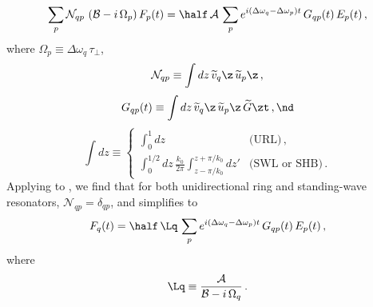 \begin{equation} \label{eqn:mml_fq_sol_temp}
  \sum_p \mathcal{N}_{q p}\, \left(\mathcal{B} - i\, \Omega_p\right) F_p(t) = \half\, \mathcal{A}\, \sum_p e^{i \left(\Delta \omega_q - \Delta \omega_p\right) t}\, G_{q p}(t)\, E_p(t)\, , 
\end{equation}
where $\Omega_p \equiv \Delta \omega_q\, \tau_\perp$,
\begin{equation} \label{eqn:mml_nqp_def}
  \mathcal{N}_{q p} \equiv \int d z\, \widetilde{v}_q\z\, \widetilde{u}_p\z\, ,
\end{equation}
\begin{equation} \label{eqn:mml_gqp_def}  
  G_{q p}(t) \equiv \int d z\, \widetilde{v}_q\z\, \widetilde{u}_p\z\, \widetilde{G}\zt\, , \nd
\end{equation}
\begin{equation} \label{eqn:mml_zop_def}
  \int d z \equiv \begin{cases}
    \int_0^{1} d z & \mbox{(URL)}\, , \\
    \int_0^{1/2} d z\, \frac{k_0}{2 \pi} \int_{z - \pi/k_0}^{z + \pi/k_0} d z' & \mbox{(SWL or SHB)}\, .
  \end{cases}
\end{equation}
Applying  to , we find that for both unidirectional ring and standing-wave resonators, $\mathcal{N}_{q p} = \delta_{q p}$, and  simplifies to
\begin{equation} \label{eqn:mml_fq_sol}
  F_q(t) = \half\, \Lq\, \sum_p e^{i \left(\Delta \omega_q - \Delta \omega_p\right) t}\, G_{q p}(t)\, E_p(t)\, ,
\end{equation}
where
\begin{equation} \label{eqn:mml_lq_def}
  \Lq \equiv \frac{\mathcal{A}}{\mathcal{B} - i\, \Omega_q}\, .
\end{equation}

